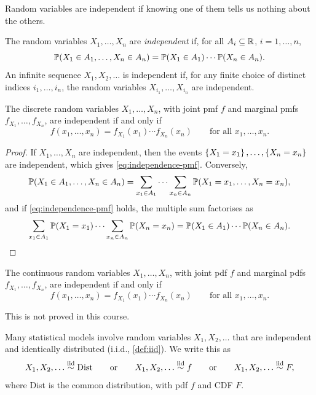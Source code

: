 Random variables are independent if knowing one of them tells us nothing about the others.

\begin{definition}\label{def:independent-rvs}
The random variables $X_1, \ldots, X_n$ are \emph{independent} if, for all $A_i \subseteq \mathbb{R}$, $i = 1, \ldots, n$,
\[
  \mathbb{P}(X_1 \in A_1, \ldots, X_n \in A_n) = \mathbb{P}(X_1 \in A_1) \cdots \mathbb{P}(X_n \in A_n).
\]
An infinite sequence $X_1, X_2, \ldots$ is independent if, for any finite choice of distinct indices $i_1, \ldots, i_n$, the random variables $X_{i_1}, \ldots, X_{i_n}$ are independent.
\end{definition}

\begin{theorem}\label{thm:independent-discrete}
The discrete random variables $X_1, \ldots, X_n$, with joint pmf $f$ and marginal pmfs $f_{X_1}, \ldots, f_{X_n}$, are independent if and only if
\begin{equation}\label{eq:independence-pmf}
  f(x_1, \ldots, x_n) = f_{X_1}(x_1) \cdots f_{X_n}(x_n) \qquad \text{for all } x_1, \ldots, x_n.
\end{equation}
\end{theorem}

\begin{proof}
If $X_1, \ldots, X_n$ are independent, then the events $\left\{ X_1 = x_1 \right\}, \ldots, \left\{ X_n = x_n \right\}$ are independent, which gives \eqref{eq:independence-pmf}. Conversely,
\[
  \mathbb{P}(X_1 \in A_1, \ldots, X_n \in A_n) = \sum_{x_1 \in A_1} \cdots \sum_{x_n \in A_n} \mathbb{P}(X_1 = x_1, \ldots, X_n = x_n),
\]
and if \eqref{eq:independence-pmf} holds, the multiple sum factorises as
\[
  \sum_{x_1 \in A_1} \mathbb{P}(X_1 = x_1) \cdots \sum_{x_n \in A_n} \mathbb{P}(X_n = x_n) = \mathbb{P}(X_1 \in A_1) \cdots \mathbb{P}(X_n \in A_n). \qedhere
\]
\end{proof}

\begin{theorem}\label{thm:independent-continuous}
The continuous random variables $X_1, \ldots, X_n$, with joint pdf $f$ and marginal pdfs $f_{X_1}, \ldots, f_{X_n}$, are independent if and only if
\[
  f(x_1, \ldots, x_n) = f_{X_1}(x_1) \cdots f_{X_n}(x_n) \qquad \text{for all } x_1, \ldots, x_n.
\]
\end{theorem}

This is not proved in this course.

Many statistical models involve random variables $X_1, X_2, \ldots$ that are independent and identically distributed (i.i.d., \cref{def:iid}). We write this as
\[
  X_1, X_2, \ldots \overset{\text{iid}}{\sim} \text{Dist} \qquad \text{or} \qquad X_1, X_2, \ldots \overset{\text{iid}}{\sim} f \qquad \text{or} \qquad X_1, X_2, \ldots \overset{\text{iid}}{\sim} F,
\]
where Dist is the common distribution, with pdf $f$ and CDF $F$.


